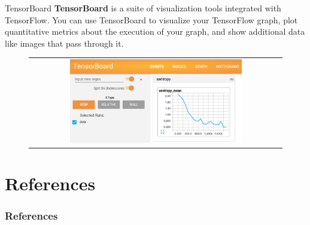 \documentclass[aspectratio=169]{beamer}
\begin{document}
\begin{frame}{TensorBoard}
\textbf{TensorBoard} is a suite of visualization tools integrated with TensorFlow. You can use TensorBoard to visualize your TensorFlow graph, plot quantitative metrics about the execution of your graph, and show additional data like images that pass through it.
\begin{figure}
\begin{tabular}{c}
\includegraphics[width=0.7\textwidth]{img/tf/tensorboard.jpg}
\end{tabular}
\end{figure}

\end{frame}




\begin{frame}
\cite{tensorflow2015-whitepaper}
\end{frame}


\section{References}

\begin{frame}[t, allowframebreaks]
\frametitle{References}


\end{frame}
\end{document}
